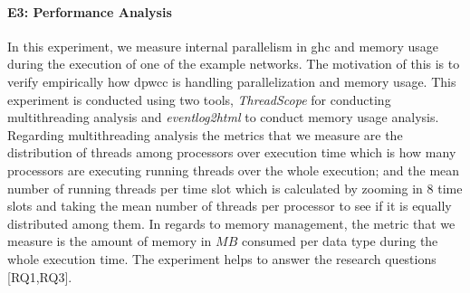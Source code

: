   \paragraph{E3: Performance Analysis}
  In this experiment, we measure internal parallelism in \acrshort{ghc} and memory usage during the execution of one of the example networks. The motivation of this is to verify empirically how \acrshort{dpwcc} is handling parallelization and memory usage. This experiment is conducted using two tools, \textit{ThreadScope} \cite{threadscope} for conducting multithreading analysis and \textit{eventlog2html} \cite{eventlog2html} to conduct memory usage analysis. Regarding multithreading analysis the metrics that we measure are the distribution of threads among processors over execution time which is how many processors are executing running threads over the whole execution; and the mean number of running threads per time slot which is calculated by zooming in $8$ time slots and taking the mean number of threads per processor to see if it is equally distributed among them. In regards to memory management, the metric that we measure is the amount of memory in $MB$ consumed per data type during the whole execution time. The experiment helps to answer the research questions [RQ1,RQ3].
  
